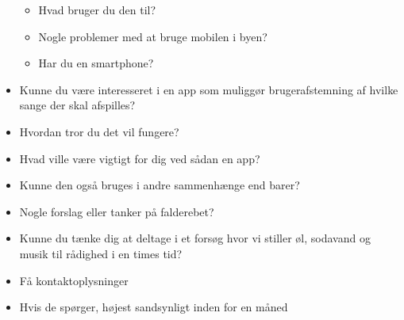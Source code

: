 \begin{itemize}
\begin{itemize}
  \item
    Hvad bruger du den til?
  \item
    Nogle problemer med at bruge mobilen i byen?
  \item
    Har du en smartphone?
  \end{itemize}
\item
  Kunne du være interesseret i en app som muliggør brugerafstemning af
  hvilke sange der skal afspilles?
\item
  Hvordan tror du det vil fungere?
\item
  Hvad ville være vigtigt for dig ved sådan en app?
\item
  Kunne den også bruges i andre sammenhænge end barer?
\item
  Nogle forslag eller tanker på falderebet?
\item
  Kunne du tænke dig at deltage i et forsøg hvor vi stiller øl, sodavand
  og musik til rådighed i en times tid?
\item
  Få kontaktoplysninger
\item
  Hvis de spørger, højest sandsynligt inden for en måned
\end{itemize}
